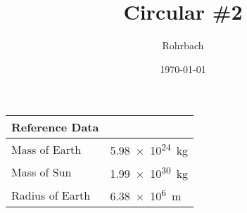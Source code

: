 \documentclass[10pt]{exam}
\title{Circular \#2}
\author{Rohrbach}
\date{\today}
\begin{document}
\maketitle

\newcommand{\printdata}{
  \begin{center}
    \begin{tabular}{ll}
      \hline
      Reference Data  & \\
      \hline
      Mass of Earth   & \SI{5.98e24}{\kilo\gram} \\
      Mass of Sun     & \SI{1.99e30}{\kilo\gram} \\
      Radius of Earth & \SI{6.38e6}{\meter}      \\
      \hline
    \end{tabular}
  \end{center}
}

\printdata
\end{document}
